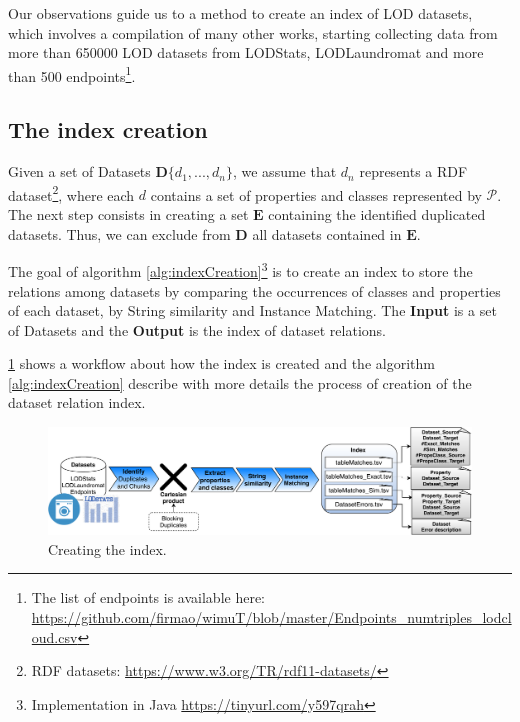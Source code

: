 \documentclass[sw]{iosart2x}
\begin{document}
Our observations guide us to a method to create an index of LOD datasets, which involves a compilation of many other works, starting collecting data from more than \num{650000} LOD datasets from LODStats, LODLaundromat and more than 500 endpoints\footnote{The list of endpoints is available here: \url{https://github.com/firmao/wimuT/blob/master/Endpoints_numtriples_lodcloud.csv}}. 


\subsection{The index creation}
\label{sec:indexCreation}

Given a set of Datasets $\mathbf{D}\{d_1,...,d_n\}$, we assume that $d_n$ represents a RDF dataset\footnote{RDF datasets: \url{https://www.w3.org/TR/rdf11-datasets/}}, where each $d$ contains a set of properties and classes represented by $\mathcal{P}$.
The next step consists in creating a set $\mathbf{E}$ containing the identified duplicated datasets.
Thus, we can exclude from $\mathbf{D}$ all datasets contained in $\mathbf{E}$.

The goal of algorithm \ref{alg:indexCreation}\footnote{Implementation in Java \url{https://tinyurl.com/y597qrah}} is to create an index to store the relations among datasets by comparing the occurrences of classes and properties of each dataset, by String similarity and Instance Matching.
The \textbf{Input} is a set of Datasets and the \textbf{Output} is the index of dataset relations.

\cref{fig:create} shows a workflow about how the index is created and the algorithm \ref{alg:indexCreation} describe with more details the process of creation of the dataset relation index.

\begin{figure}[htb] 
	\centering
	\includegraphics[width=\linewidth]{img/createIndex.pdf}
	\caption{Creating the index.}
	\label{fig:create}
\end{figure}
\end{document}
